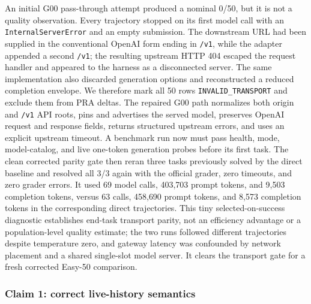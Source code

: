 \documentclass[11pt]{article}
\begin{document}
An initial G00 pass-through attempt produced a nominal 0/50, but it is not a
quality observation. Every trajectory stopped on its first model call with an
\texttt{InternalServerError} and an empty submission. The downstream URL had
been supplied in the conventional OpenAI form ending in \texttt{/v1}, while the
adapter appended a second \texttt{/v1}; the resulting upstream HTTP 404 escaped
the request handler and appeared to the harness as a disconnected server. The
same implementation also discarded generation options and reconstructed a
reduced completion envelope. We therefore mark all 50 rows
\texttt{INVALID\_TRANSPORT} and exclude them from PRA deltas. The repaired G00
path normalizes both origin and \texttt{/v1} API roots, pins and advertises the
served model, preserves OpenAI request and response fields, returns structured
upstream errors, and uses an explicit upstream timeout. A benchmark run now
must pass health, mode, model-catalog, and live one-token generation probes
before its first task. The clean corrected parity gate then reran three tasks
previously solved by the direct baseline and resolved all 3/3 again with the
official grader, zero timeouts, and zero grader errors. It used 69 model calls,
403,703 prompt tokens, and 9,503 completion tokens, versus 63 calls, 458,690
prompt tokens, and 8,573 completion tokens in the corresponding direct
trajectories. This tiny selected-on-success diagnostic establishes end-task
transport parity, not an efficiency advantage or a population-level quality
estimate; the two runs followed different trajectories despite temperature
zero, and gateway latency was confounded by network placement and a shared
single-slot model server. It clears the transport gate for a fresh corrected
Easy-50 comparison.

\subsubsection{Claim 1: correct live-history semantics}
\end{document}
